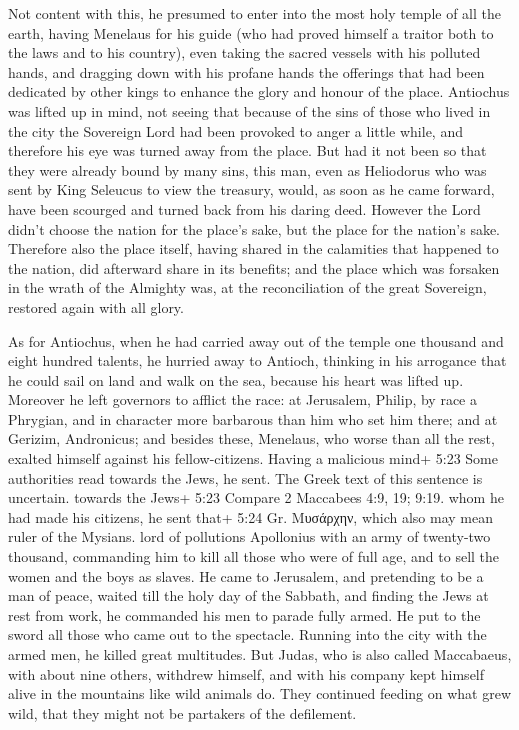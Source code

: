  Not content with this, he presumed to enter into the most
holy temple of all the earth, having Menelaus for his guide (who had
proved himself a traitor both to the laws and to his country),
 even taking the sacred vessels with his polluted hands,
and dragging down with his profane hands the offerings that had been
dedicated by other kings to enhance the glory and honour of the place.
 Antiochus was lifted up in mind, not seeing that because
of the sins of those who lived in the city the Sovereign Lord had been
provoked to anger a little while, and therefore his eye was turned away
from the place.  But had it not been so that they were
already bound by many sins, this man, even as Heliodorus who was sent by
King Seleucus to view the treasury, would, as soon as he came forward,
have been scourged and turned back from his daring deed. 
However the Lord didn't choose the nation for the place's sake, but the
place for the nation's sake.  Therefore also the place
itself, having shared in the calamities that happened to the nation, did
afterward share in its benefits; and the place which was forsaken in the
wrath of the Almighty was, at the reconciliation of the great Sovereign,
restored again with all glory.

 As for Antiochus, when he had carried away out of the
temple one thousand and eight hundred talents, he hurried away to
Antioch, thinking in his arrogance that he could sail on land and walk
on the sea, because his heart was lifted up.  Moreover he
left governors to afflict the race: at Jerusalem, Philip, by race a
Phrygian, and in character more barbarous than him who set him there;
 and at Gerizim, Andronicus; and besides these, Menelaus,
who worse than all the rest, exalted himself against his
fellow-citizens. Having a malicious mind+ 5:23 Some authorities read
towards the Jews, he sent. The Greek text of this sentence is uncertain.
towards the Jews+ 5:23 Compare 2 Maccabees 4:9, 19; 9:19. whom he had
made his citizens,  he sent that+ 5:24 Gr. Μυσάρχην, which
also may mean ruler of the Mysians. lord of pollutions Apollonius with
an army of twenty-two thousand, commanding him to kill all those who
were of full age, and to sell the women and the boys as slaves.
 He came to Jerusalem, and pretending to be a man of peace,
waited till the holy day of the Sabbath, and finding the Jews at rest
from work, he commanded his men to parade fully armed.  He
put to the sword all those who came out to the spectacle. Running into
the city with the armed men, he killed great multitudes. 
But Judas, who is also called Maccabaeus, with about nine others,
withdrew himself, and with his company kept himself alive in the
mountains like wild animals do. They continued feeding on what grew
wild, that they might not be partakers of the defilement.

